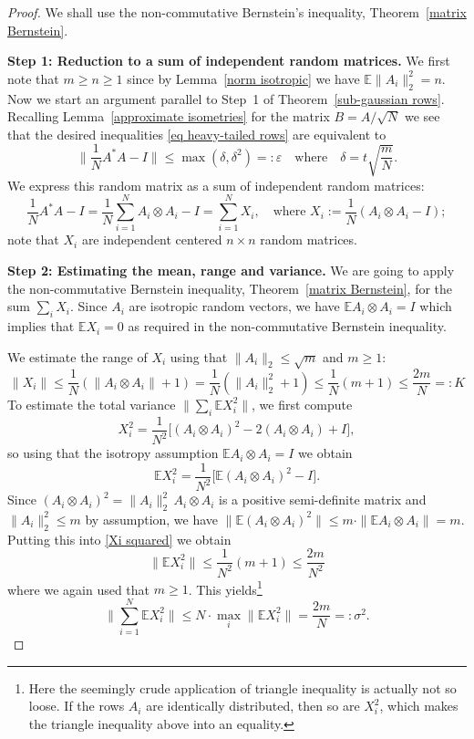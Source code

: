 \documentclass[10pt, openany]{book}
\theoremstyle{remark}
\def \E {\mathbb{E}}
\def \e {\varepsilon}
\def \d {\delta}
\def \s {\sigma}
\begin{document}
\begin{proof}
We shall use the non-commutative Bernstein's inequality, Theorem~\ref{matrix Bernstein}.

{\bf Step 1: Reduction to a sum of independent random matrices.}
We first note that $m \ge n \ge 1$ since by Lemma~\ref{norm isotropic} we have $\E \|A_i\|_2^2 = n$.
Now we start an argument parallel to Step~1 of Theorem~\ref{sub-gaussian rows}. 
Recalling Lemma~\ref{approximate isometries} for the matrix $B=A/\sqrt{N}$ we see 
that the desired inequalities \eqref{eq heavy-tailed rows} are equivalent to 
\begin{equation}							\label{A*A heavy-tailed}
\big\| \frac{1}{N}A^*A-I \big\| \le \max(\d, \d^2) =:\e
\quad \text{where} \quad
\d = t \sqrt{\frac{m}{N}}.
\end{equation}
We express this random matrix as a sum of independent random matrices:
$$
\frac{1}{N} A^*A - I = \frac{1}{N} \sum_{i=1}^N A_i \otimes A_i - I  
= \sum_{i=1}^N X_i, 
\quad \text{where } X_i := \frac{1}{N} (A_i \otimes A_i - I);
$$
note that $X_i$ are independent centered $n \times n$ random matrices. 


{\bf Step 2: Estimating the mean, range and variance.}
We are going to apply the non-commutative Bernstein inequality, Theorem~\ref{matrix Bernstein}, for the sum $\sum_i X_i$.
Since $A_i$ are isotropic random vectors, we have $\E A_i \otimes A_i = I$
which implies that $\E X_i = 0$ as required in the non-commutative Bernstein inequality.

We estimate the range of $X_i$ using that $\|A_i\|_2 \le \sqrt{m}$ and $m \ge 1$:
$$
\|X_i\| 
\le \frac{1}{N} ( \|A_i \otimes A_i\| + 1)
= \frac{1}{N} (\|A_i\|_2^2 + 1) 
\le \frac{1}{N} (m + 1)
\le \frac{2 m}{N}
=: K
$$
To estimate the total variance $\|\sum_i \E X_i^2\|$, we first compute
$$
X_i^2 = \frac{1}{N^2} \big[ (A_i \otimes A_i)^2 - 2(A_i \otimes A_i) + I \big],
$$
so using that the isotropy assumption $\E A_i \otimes A_i = I$ we obtain
\begin{equation}							\label{Xi squared}
\E X_i^2 = \frac{1}{N^2} \big[ \E (A_i \otimes A_i)^2 - I \big].
\end{equation}
Since $(A_i \otimes A_i)^2 = \|A_i\|_2^2 \, A_i \otimes A_i$ is a positive semi-definite matrix 
and $\|A_i\|_2^2 \le m$ by assumption, we have
$\big\| \E (A_i \otimes A_i)^2 \big\| \le m \cdot \| \E A_i \otimes A_i \| = m$.
Putting this into \eqref{Xi squared} we obtain
$$
\| \E X_i^2 \| \le \frac{1}{N^2} (m + 1) \le \frac{2 m}{N^2}
$$
where we again used that $m \ge 1$. 
This yields\footnote{Here the seemingly crude application of triangle inequality is actually not 
so loose. If the rows $A_i$ are identically distributed, then so are $X_i^2$, 
which makes the triangle inequality above into an equality.}
$$
\Big\| \sum_{i=1}^N \E X_i^2 \Big\| 
\le N \cdot \max_i \| \E X_i^2 \|
= \frac{2m}{N}
=: \s^2.
$$



\end{proof}
\end{document}
